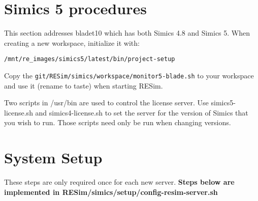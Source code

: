 \documentclass[titlepage]{article}
\begin{document}
\section{Simics 5 procedures}
This section addresses bladet10 which has both Simics 4.8 and Simics 5.
When creating a new workspace, initialize it with:
\begin{verbatim}
/mnt/re_images/simics5/latest/bin/project-setup
\end{verbatim}
\noindent Copy the {\tt git/RESim/simics/workspace/monitor5-blade.sh} to your workspace and use it (rename to taste) when starting RESim.

Two scripts in /usr/bin are used to control the license server.  Use simics5-license.sh and simics4-license.sh to set the server for the
version of Simics that you wish to run.  Those scripts need only be run when changing versions.

\section{System Setup} 
\label{section-system}
These steps are only required once for each new server.
\textbf{Steps below are implemented in RESim/simics/setup/config-resim-server.sh}
\end{document}
